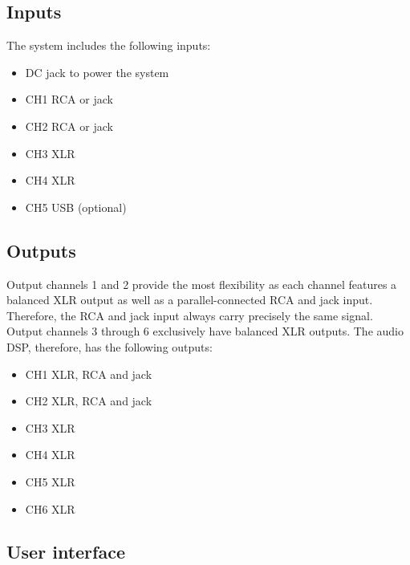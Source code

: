 \subsection{Inputs}
The system includes the following inputs:
\begin{itemize}
    \item DC jack to power the system
    \item CH1 RCA or jack
    \item CH2 RCA or jack
    \item CH3 XLR
    \item CH4 XLR
    \item CH5 USB (optional)
\end{itemize}

\subsection{Outputs}
Output channels 1 and 2 provide the most flexibility as each channel features a balanced XLR output as well as a parallel-connected RCA and jack input. Therefore, the RCA and jack input always carry precisely the same signal. Output channels 3 through 6 exclusively have balanced XLR outputs. The audio DSP, therefore, has the following outputs:

\begin{itemize}
    \item CH1 XLR, RCA and jack
    \item CH2 XLR, RCA and jack
    \item CH3 XLR
    \item CH4 XLR
    \item CH5 XLR
    \item CH6 XLR
\end{itemize}

\subsection{User interface}

